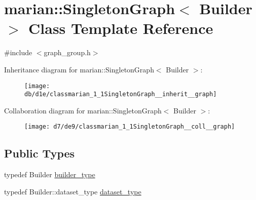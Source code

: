 \hypertarget{classmarian_1_1SingletonGraph}{}\section{marian\+:\+:Singleton\+Graph$<$ Builder $>$ Class Template Reference}
\label{classmarian_1_1SingletonGraph}


{\ttfamily \#include $<$graph\+\_\+group.\+h$>$}



Inheritance diagram for marian\+:\+:Singleton\+Graph$<$ Builder $>$\+:
\nopagebreak
\begin{figure}[H]
\begin{center}
\leavevmode
\texttt{[image: db/d1e/classmarian\_1\_1SingletonGraph\_\_inherit\_\_graph]}
\end{center}
\end{figure}


Collaboration diagram for marian\+:\+:Singleton\+Graph$<$ Builder $>$\+:
\nopagebreak
\begin{figure}[H]
\begin{center}
\leavevmode
\texttt{[image: d7/de9/classmarian\_1\_1SingletonGraph\_\_coll\_\_graph]}
\end{center}
\end{figure}
\subsection*{Public Types}
\begin{DoxyCompactItemize}
\item 
typedef Builder \hyperlink{classmarian_1_1SingletonGraph_aa1976dc1eff06ae05814084160b1cd3e}{builder\+\_\+type}
\item 
typedef Builder\+::dataset\+\_\+type \hyperlink{classmarian_1_1SingletonGraph_a6bb5603e1b8641cd65bd7b032cbecefd}{dataset\+\_\+type}
\end{DoxyCompactItemize}
